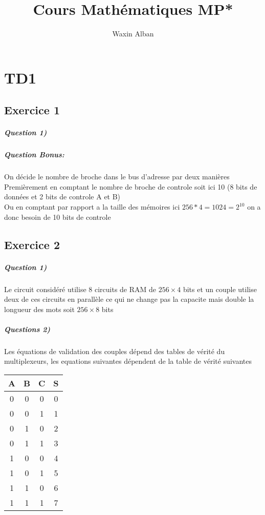\documentclass[12pt]{report}
\title{Cours Mathématiques MP*}
\author{Waxin Alban}
\begin{document}
\chapter{TD1}

\section{Exercice 1}

\paragraph*{Question 1)}

\paragraph*{Question Bonus:}
On décide le nombre de broche dans le bus d'adresse  par deux manières \\
Premièrement en comptant le nombre de broche de controle soit ici 10 (8 bits de données et 2 bits de controle A et B)\\
Ou en comptant par rapport a la taille des mémoires ici $256 * 4 = 1024= 2^10$ on a donc besoin de 10 bits de controle
\section{Exercice 2}

\paragraph*{Question 1)} 
 Le circuit considéré utilise 8 circuits de RAM de $256 \times 4$ bits et un couple utilise deux de ces circuits en parallèle ce qui ne change pas la capacite mais double la longueur des mots soit $256\times 8$ bits
 
 \paragraph*{Questions 2)}
 
Les équations de validation des couples dépend des tables de vérité du multiplexeurs, les equations suivantes dépendent de la table de vérité suivantes

\begin{tabular}{|c|c|c|c|}
\hline
A&B&C&S\\
\hline
0&0&0&0\\
0&0&1&1\\
0&1&0&2\\
0&1&1&3\\
1&0&0&4\\
1&0&1&5\\
1&1&0&6\\
1&1&1&7\\
\hline
\end{tabular}
\end{document}
